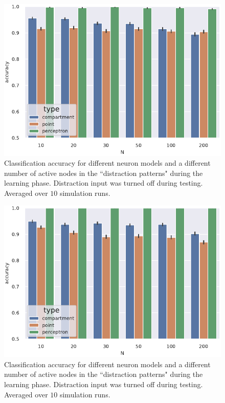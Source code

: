 \documentclass[10pt,a4paper]{article}
\begin{document}
\begin{figure}
	\includegraphics[width=\textwidth]{./figures/accuracy_distraction_patterns_no_distraction_during_testing.pdf}
	\caption{Classification accuracy for different neuron models and a different number of active nodes in the ``distraction patterns" during the learning phase. Distraction input was turned off during testing. Averaged over $10$ simulation runs.}
	\label{fig:distraction_patterns}
\end{figure}

\begin{figure}
	\includegraphics[width=\textwidth]{./figures/accuracy_distraction_patterns_distraction_during_testing.pdf}
	\caption{Classification accuracy for different neuron models and a different number of active nodes in the ``distraction patterns" during the learning phase. Distraction input was turned off during testing. Averaged over $10$ simulation runs.}
	\label{fig:distraction_patterns_2}
\end{figure}
\end{document}
